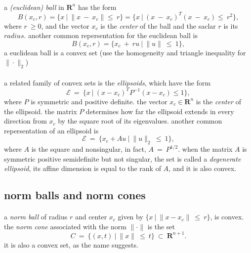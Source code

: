 \documentclass{article}
\begin{document}
    \paragraph{} a \textit{(euclidean) ball} in $\mathbf{R}^n$ has the form
    \begin{equation}
      B(x_c, r) = \{x\ |\ \| x \ - \ x_c \| \leq \ r\} = \{x\ |\ (x\ -\ x_c)^T(x\ -\ x_c) \leq \ r^2\},
    \end{equation}
    where $r\ \ge 0$, and the vector $x_c$ is the \textit{center} of the ball and the saclar $r$ is its $radius$. another common repersentation for the euclidean ball is
    \begin{equation}
      B(x_c, r) = \{x_c\ +\ ru\ |\ \|u\|\ \leq\ 1\},
    \end{equation}
    a euclidean ball is a convex set (use the homogeneity and triangle inequality for $\|\cdot\|_2$)
    \paragraph{} a related family of convex sets is the \textit{ellipsoids}, which have the form
    \begin{equation}
      \mathcal{E}\ =\ \{x\ |\ (x - x_c)^TP^{-1}(x - x_c)\leq 1\},
    \end{equation}
    where $P$ is symmetric and positive definite. the vector $x_c \in \mathbf{R}^n$ is the \textit{center} of the ellipsoid. the matrix $P$ determines how far the ellipsoid extends in every direction from $x_c$ by the square root of its eigenvalues. another common repersentation of an ellipsoid is
    \begin{equation}
      \mathcal{E}\ =\ \{x_c + Au\ |\ \|u\|_2\ \leq\ 1\},
    \end{equation}
    where $A$ is the square and nonsingular, in fact, $A\ =\ P^{1/2}$. when the matrix $A$ is symmetric positive semidefinite but not singular, the set is called a \textit{degenerate ellipsoid}, its affine dimension is equal to the rank of $A$, and it is also convex.
  \subsection{norm balls and norm cones}
    \paragraph{} a \textit{norm ball} of radius $r$ and center $x_c$ given by $\{x\ |\ \|x - x_c\|\ \leq\ r\}$, is convex. the \textit{norm cone} associated with the norm $\|\cdot\|$ is the set
    \begin{equation}
      C\ =\ \{(x,t)\ |\ \|x\|\ \leq\ t\}\ \subset\ \mathbf{R}^{n + 1}.
    \end{equation}
    it is also a convex set, as the name suggests.
\end{document}
